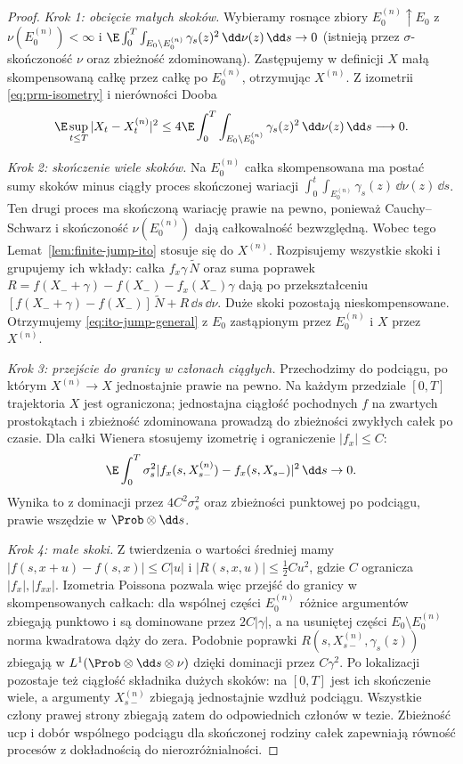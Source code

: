 \begin{proof}
\emph{Krok 1: obcięcie małych skoków.} Wybieramy rosnące
zbiory $E_0^{(n)}\uparrow E_0$ z
$\nu(E_0^{(n)})<\infty$ i
$\E\int_0^T\int_{E_0\setminus E_0^{(n)}}\gamma_s(z)^2
\,\dd\nu(z)\,\dd s\to0$ (istnieją przez $\sigma$-skończoność
$\nu$ oraz zbieżność zdominowaną).
Zastępujemy w definicji $X$ małą skompensowaną całkę
przez całkę po $E_0^{(n)}$, otrzymując $X^{(n)}$.
Z izometrii \eqref{eq:prm-isometry} i nierówności Dooba
\[
\E\sup_{t\le T}|X_t-X_t^{(n)}|^2
\le4\E\int_0^T\int_{E_0\setminus E_0^{(n)}}\gamma_s(z)^2
\,\dd\nu(z)\,\dd s\longrightarrow0.
\]

\emph{Krok 2: skończenie wiele skoków.} Na $E_0^{(n)}$
całka skompensowana ma postać sumy skoków minus
ciągły proces skończonej wariacji
$\int_0^t\int_{E_0^{(n)}}\gamma_s(z)\,\dd\nu(z)\,\dd s$.
Ten drugi proces ma skończoną wariację prawie na pewno,
ponieważ Cauchy--Schwarz i skończoność $\nu(E_0^{(n)})$
dają całkowalność bezwzględną. Wobec tego
Lemat~\ref{lem:finite-jump-ito} stosuje się do $X^{(n)}$.
Rozpisujemy wszystkie skoki i grupujemy ich wkłady:
całka $f_x\gamma\,\widetilde N$ oraz suma poprawek
$R=f(X_-+\gamma)-f(X_-)-f_x(X_-)\gamma$ dają
po przekształceniu
$[f(X_-+\gamma)-f(X_-)]\,\widetilde N+R\,\dd s\,\dd\nu$.
Duże skoki pozostają nieskompensowane. Otrzymujemy
\eqref{eq:ito-jump-general} z $E_0$ zastąpionym przez
$E_0^{(n)}$ i $X$ przez $X^{(n)}$.

\emph{Krok 3: przejście do granicy w członach ciągłych.}
Przechodzimy do podciągu, po którym $X^{(n)}\to X$
jednostajnie prawie na pewno. Na każdym przedziale
$[0,T]$ trajektoria $X$ jest ograniczona; jednostajna
ciągłość pochodnych $f$ na zwartych prostokątach
i zbieżność zdominowana prowadzą do zbieżności
zwykłych całek po czasie. Dla całki Wienera stosujemy
izometrię i ograniczenie $|f_x|\le C$:
\[
\E\int_0^T\sigma_s^2
|f_x(s,X^{(n)}_{s-})-f_x(s,X_{s-})|^2\,\dd s\to0.
\]
Wynika to z dominacji przez $4C^2\sigma_s^2$ oraz
zbieżności punktowej po podciągu, prawie wszędzie
w $\Prob\otimes\dd s$.

\emph{Krok 4: małe skoki.} Z twierdzenia o wartości
średniej mamy
$|f(s,x+u)-f(s,x)|\le C|u|$ i
$|R(s,x,u)|\le\frac12C u^2$, gdzie $C$ ogranicza
$|f_x|,|f_{xx}|$. Izometria Poissona pozwala więc
przejść do granicy w skompensowanych całkach:
dla wspólnej części $E_0^{(n)}$ różnice argumentów
zbiegają punktowo i są dominowane przez $2C|\gamma|$,
a na usuniętej części $E_0\setminus E_0^{(n)}$
norma kwadratowa dąży do zera. Podobnie poprawki
$R(s,X^{(n)}_{s-},\gamma_s(z))$ zbiegają w
$L^1(\Prob\otimes\dd s\otimes\nu)$ dzięki dominacji
przez $C\gamma^2$. Po lokalizacji pozostaje też
ciągłość składnika dużych skoków: na $[0,T]$ jest ich
skończenie wiele, a argumenty $X^{(n)}_{s-}$ zbiegają
jednostajnie wzdłuż podciągu. Wszystkie człony prawej
strony zbiegają zatem do odpowiednich członów w tezie.
Zbieżność ucp i dobór wspólnego podciągu dla skończonej
rodziny całek zapewniają równość procesów z dokładnością
do nierozróżnialności.
\end{proof}

